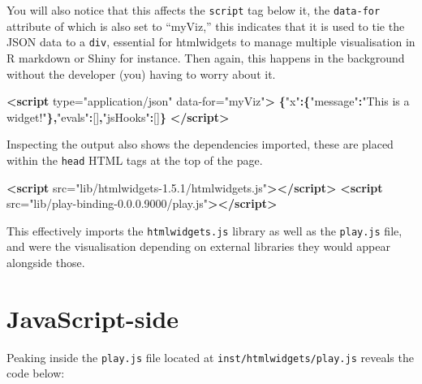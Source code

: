\documentclass[
]{krantz}
\makeatletter
\newenvironment{Shaded}{\begin{snugshade}}{\end{snugshade}}
\newcommand{\KeywordTok}[1]{\textcolor[rgb]{0.27,0.27,0.27}{\textbf{#1}}}
\newcommand{\NormalTok}[1]{#1}
\newcommand{\OperatorTok}[1]{\textcolor[rgb]{0.43,0.43,0.43}{\textbf{#1}}}
\newcommand{\OtherTok}[1]{\textcolor[rgb]{0.37,0.37,0.37}{#1}}
\newcommand{\StringTok}[1]{\textcolor[rgb]{0.5,0.5,0.5}{#1}}
\newenvironment{kframe}{%
\medskip{}
\setlength{\fboxsep}{.8em}
 \def\at@end@of@kframe{}%
 \ifinner\ifhmode%
  \def\at@end@of@kframe{\end{minipage}}%
  \begin{minipage}{\columnwidth}%
 \fi\fi%
 \def\FrameCommand##1{\hskip\@totalleftmargin \hskip-\fboxsep
 \colorbox{shadecolor}{##1}\hskip-\fboxsep
     \hskip-\linewidth \hskip-\@totalleftmargin \hskip\columnwidth}%
 \MakeFramed {\advance\hsize-\width
   \@totalleftmargin\z@ \linewidth\hsize
   \@setminipage}}%
 {\par\unskip\endMakeFramed%
 \at@end@of@kframe}
\renewenvironment{Shaded}{\begin{kframe}}{\end{kframe}}
\makeatother
\begin{document}
You will also notice that this affects the \texttt{script} tag below it, the \texttt{data-for} attribute of which is also set to ``myViz,'' this indicates that it is used to tie the JSON data to a \texttt{div}, essential for htmlwidgets to manage multiple visualisation in R markdown or Shiny for instance. Then again, this happens in the background without the developer (you) having to worry about it.

\begin{Shaded}
\begin{Highlighting}[]
\KeywordTok{<script}\OtherTok{ type=}\StringTok{"application/json"} 
\OtherTok{  data{-}for=}\StringTok{"myViz"}\KeywordTok{>}
  \OperatorTok{\{}\StringTok{"x"}\OperatorTok{:\{}\StringTok{"message"}\OperatorTok{:}\StringTok{"This is a widget!"}\OperatorTok{\},}\StringTok{"evals"}\OperatorTok{:}\NormalTok{[]}\OperatorTok{,}\StringTok{"jsHooks"}\OperatorTok{:}\NormalTok{[]}\OperatorTok{\}}
\KeywordTok{</script>}
\end{Highlighting}
\end{Shaded}

Inspecting the output also shows the dependencies imported, these are placed within the \texttt{head} HTML tags at the top of the page.

\begin{Shaded}
\begin{Highlighting}[]
\KeywordTok{<script}\OtherTok{ src=}\StringTok{"lib/htmlwidgets{-}1.5.1/htmlwidgets.js"}\KeywordTok{></script>}
\KeywordTok{<script}\OtherTok{ src=}\StringTok{"lib/play{-}binding{-}0.0.0.9000/play.js"}\KeywordTok{></script>}
\end{Highlighting}
\end{Shaded}

This effectively imports the \texttt{htmlwidgets.js} library as well as the \texttt{play.js} file, and were the visualisation depending on external libraries they would appear alongside those.

\hypertarget{javascript-side}{%
\section{JavaScript-side}\label{javascript-side}}

Peaking inside the \texttt{play.js} file located at \texttt{inst/htmlwidgets/play.js} reveals the code below:
\end{document}
